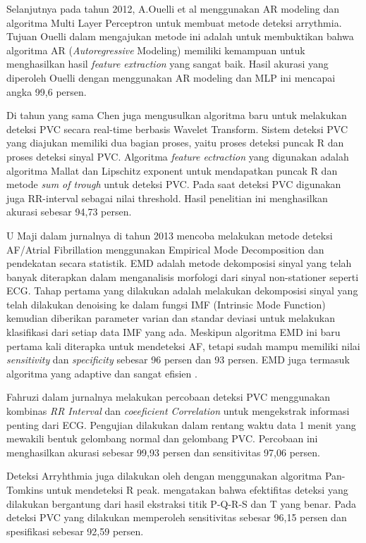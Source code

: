 Selanjutnya pada tahun 2012, A.Ouelli et al\cite{A.Ouelli2012_AR} menggunakan AR modeling dan algoritma Multi Layer Perceptron untuk membuat metode deteksi arrythmia. Tujuan Ouelli dalam mengajukan metode ini adalah untuk membuktikan bahwa algoritma AR (\textit{Autoregressive} Modeling) memiliki kemampuan untuk menghasilkan hasil \textit{feature extraction} yang sangat baik. Hasil akurasi yang diperoleh Ouelli dengan menggunakan AR modeling dan MLP ini mencapai angka 99,6 persen.

Di tahun yang sama Chen\cite{RobertChen} juga mengusulkan algoritma baru untuk melakukan deteksi PVC secara real-time berbasis Wavelet Transform. Sistem deteksi PVC yang diajukan memiliki dua bagian proses, yaitu proses deteksi puncak R dan proses deteksi sinyal PVC. Algoritma \textit{feature ectraction} yang digunakan adalah algoritma Mallat dan Lipschitz exponent untuk mendapatkan puncak R dan metode \textit{sum of trough} untuk deteksi PVC. Pada saat deteksi PVC digunakan juga RR-interval sebagai nilai threshold. Hasil penelitian ini menghasilkan akurasi sebesar 94,73 persen.

U Maji \cite{UMaji} dalam jurnalnya di tahun 2013 mencoba melakukan metode deteksi AF/Atrial Fibrillation menggunakan Empirical Mode Decomposition dan pendekatan secara statistik. EMD adalah metode dekomposisi sinyal yang telah banyak diterapkan dalam menganalisis morfologi dari sinyal non-stationer seperti ECG. Tahap pertama yang dilakukan adalah melakukan dekomposisi sinyal yang telah dilakukan denoising ke dalam fungsi IMF (Intrinsic Mode Function) kemudian diberikan parameter varian dan standar deviasi untuk melakukan klasifikasi dari setiap data IMF yang ada. Meskipun algoritma EMD ini baru pertama kali diterapka untuk mendeteksi AF, tetapi sudah mampu memiliki nilai \textit{sensitivity} dan \textit{specificity} sebesar 96 persen dan 93 persen. EMD juga termasuk algoritma yang adaptive dan sangat efisien \cite{UMaji}.

Fahruzi \cite{fahruzi} dalam jurnalnya melakukan percobaan deteksi PVC menggunakan kombinas \textit{RR Interval} dan \textit{coeeficient Correlation} untuk mengekstrak informasi penting dari ECG. Pengujian dilakukan dalam rentang waktu data 1 menit yang mewakili bentuk gelombang normal dan gelombang PVC. Percobaan ini menghasilkan akurasi sebesar 99,93 persen dan sensitivitas 97,06 persen. 

Deteksi Arryhthmia juga dilakukan oleh \cite{rameshwari} dengan menggunakan algoritma Pan-Tomkins untuk mendeteksi R peak. \cite{rameshwari} mengatakan bahwa efektifitas deteksi yang dilakukan bergantung dari hasil ekstraksi titik P-Q-R-S dan T yang benar. Pada deteksi PVC yang dilakukan memperoleh sensitivitas sebesar 96,15 persen dan spesifikasi sebesar 92,59 persen.   

